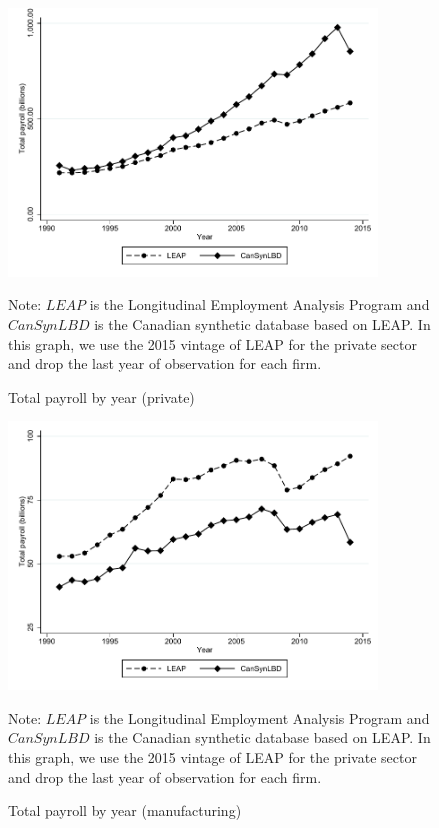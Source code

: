 \documentclass{article}
\begin{document}
\begin{figure} [H]
\centering
\caption{Total payroll by year (private)} \label{TotalPayrollPrivate}
\includegraphics[height=2.8in, width=.7\linewidth]{graphs/Total_payroll_by_year_private_bw.pdf} 
\begin{minipage}{0.85\textwidth}
{\footnotesize Note: $LEAP$ is the Longitudinal Employment Analysis Program and $CanSynLBD$ is the Canadian synthetic database based on LEAP. In this graph, we use the 2015 vintage of LEAP for the private sector and drop the last year of observation for each firm. \par}
\end{minipage}
\end{figure}
\begin{figure} [H]
\centering
\caption{Total payroll by year (manufacturing)} \label{TotalPayrollManufacturing}
\includegraphics[height=2.8in, width=.7\linewidth]{graphs/Total_payroll_by_year_manufacturing_bw.pdf} 
\begin{minipage}{0.85\textwidth}
{\footnotesize Note: $LEAP$ is the Longitudinal Employment Analysis Program and $CanSynLBD$ is the Canadian synthetic database based on LEAP. In this graph, we use the 2015 vintage of LEAP for the private sector and drop the last year of observation for each firm. \par}
\end{minipage}
\end{figure}
\end{document}
